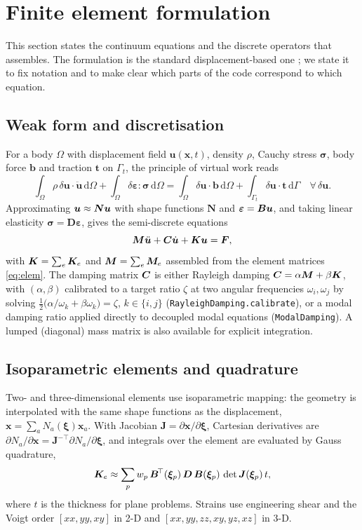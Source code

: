 \section{Finite element formulation}\label{sec:fe}

This section states the continuum equations and the discrete operators that \fea{} assembles. The formulation is the standard displacement-based
one \cite{zienkiewicz2013fem,bathe2014fep}; we state it to fix notation and to make clear which parts of the code correspond to which equation.

\subsection{Weak form and discretisation}
For a body $\Omega$ with displacement field $\bm u(\bm x,t)$, density $\rho$, Cauchy stress $\bm\sigma$, body force $\bm b$ and traction $\bm t$ on $\Gamma_t$,
the principle of virtual work reads
\begin{equation}
  \int_\Omega \rho\,\delta\bm u\cdot\ddot{\bm u}\,\mathrm d\Omega
  +\int_\Omega \delta\bm\varepsilon:\bm\sigma\,\mathrm d\Omega
  =\int_\Omega\delta\bm u\cdot\bm b\,\mathrm d\Omega+\int_{\Gamma_t}\delta\bm u\cdot\bm t\,\mathrm d\Gamma
  \quad\forall\,\delta\bm u .
  \label{eq:weak}
\end{equation}
Approximating $\bm u\approx\bm N\bm{u}$ with shape functions $\bm N$ and $\bm\varepsilon=\bm B\bm{u}$, and taking linear elasticity $\bm\sigma=\bm D\bm\varepsilon$, gives the
semi-discrete equations
\begin{equation}
  \bm{M}\ddot{\bm{u}}+\bm{C}\dot{\bm{u}}+\bm{K}\bm{u}=\bm{F},
  \label{eq:sd}
\end{equation}
with $\bm{K}=\sum_e\bm{K}_e$ and $\bm{M}=\sum_e\bm{M}_e$ assembled from the element matrices \eqref{eq:elem}.
The damping matrix $\bm{C}$ is either Rayleigh damping $\bm{C}=\alpha\bm{M}+\beta\bm{K}$, with $(\alpha,\beta)$ calibrated to a target ratio $\zeta$ at two angular frequencies
$\omega_i,\omega_j$ by solving $\tfrac12\bigl(\alpha/\omega_k+\beta\omega_k\bigr)=\zeta$, $k\in\{i,j\}$ (\texttt{RayleighDamping.calibrate}),
or a modal damping ratio applied directly to decoupled modal equations (\texttt{ModalDamping}).
A lumped (diagonal) mass matrix is also available for explicit integration.

\subsection{Isoparametric elements and quadrature}
Two- and three-dimensional elements use isoparametric mapping: the geometry is interpolated with the same shape functions as the displacement,
$\bm x=\sum_a N_a(\bm\xi)\bm x_a$. With Jacobian $\bm J=\partial\bm x/\partial\bm\xi$, Cartesian derivatives are
$\partial N_a/\partial\bm x=\bm J^{-\top}\partial N_a/\partial\bm\xi$, and integrals over the element are evaluated by Gauss quadrature,
\begin{equation}
  \bm{K}_e\approx\sum_{p}w_p\,\bm B^{\!\top}(\bm\xi_p)\,\bm D\,\bm B(\bm\xi_p)\,\det\bm J(\bm\xi_p)\,t,
  \label{eq:gauss}
\end{equation}
where $t$ is the thickness for plane problems. Strains use engineering shear and the Voigt order $[xx,yy,xy]$ in 2-D and $[xx,yy,zz,xy,yz,xz]$ in 3-D.

